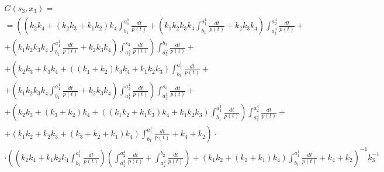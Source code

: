 \documentclass[a4paper,12pt]{article} %
\begin{document}
\begin{multline}
	G(s_3,x_3)=\\=
	\left(
		\left(
			k_2 k_4+\left( k_2 k_3+k_1 k_2\right)  k_4 \int_{b_1}^{a_1^1}\frac{dt}{p(t)}+
			\left( k_1 k_2 k_3 k_4 \int_{b_1}^{a_1^1}\frac{dt}{p(t)}+k_2 k_3 k_4\right)  \int_{a_1^4}^{a_2^4}\frac{dt}{p(t)}
			\right. \right. + \\ + \left. \left.
			\left( k_1 k_2 k_3 k_4 \int_{b_1}^{a_1^1}\frac{dt}{p(t)}+k_2 k_3 k_4\right)  \int_{a_2^3}^{s_3}\frac{dt}{p(t)}
		\right)
		\int_{a_2^2}^{b_2}\frac{dt}{p(t)}
		\right. + \\ + \left.
		\left( k_2 k_3+k_3 k_4+\left( \left( k_1+k_2\right)  k_3 k_4+k_1 k_2 k_3\right)  \int_{b_1}^{a_1^1}\frac{dt}{p(t)}
		\right. \right. + \\ + \left. \left.
		\left( k_1 k_2 k_3 k_4 \int_{b_1}^{a_1^1}\frac{dt}{p(t)}+k_2 k_3 k_4\right)  \int_{a_1^4}^{a_2^4}\frac{dt}{p(t)}\right)  \int_{a_2^3}^{s_3}\frac{dt}{p(t)}
		\right. + \\ + \left.
		\left( k_2 k_3+\left( k_3+k_2\right)  k_4+\left( \left( k_1 k_2+k_1 k_3\right)  k_4+k_1 k_2 k_3\right)  \int_{b_1}^{a_1^1}\frac{dt}{p(t)}\right)  \int_{a_1^4}^{a_2^4}\frac{dt}{p(t)}
		\right. + \\ + \left.
		\left( k_1 k_2+k_2 k_3+\left( k_3+k_2+k_1\right)  k_4\right)  \int_{b_1}^{a_1^1}\frac{dt}{p(t)}+k_4+k_2
	\right) \cdot \\ \cdot \left(
		\left( k_2 k_4+k_1 k_2 k_4 \int_{b_1}^{a_1^1}\frac{dt}{p(t)}\right)
		\left( \int_{a_1^4}^{a_2^4}\frac{dt}{p(t)}+ \int_{a_2^2}^{b_2}\frac{dt}{p(t)} \right)+
		\left( k_1 k_2+\left( k_2+k_1\right)  k_4\right)  \int_{b_1}^{a_1^1}\frac{dt}{p(t)}+k_4+k_2
	\right)^{-1}  k_3^{-1}
\end{multline}
\end{document}
